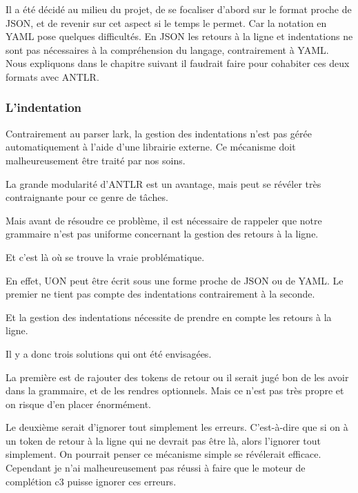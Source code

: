 \documentclass[
    iict, %
    il, %
]{heig-tb}
\begin{document}
Il a été décidé au milieu du projet, de se focaliser d'abord sur le format proche de JSON, et de revenir sur cet aspect si le temps le permet.
Car la notation en YAML pose quelques difficultés. %
En JSON les retours à la ligne et indentations ne sont pas nécessaires à la compréhension du langage, contrairement à YAML.
Nous expliquons dans le chapitre suivant il faudrait faire pour cohabiter ces deux formats avec ANTLR. %

\subsubsection{L'indentation}


Contrairement au parser lark, la gestion des indentations n'est pas gérée automatiquement à l'aide d'une librairie externe.
Ce mécanisme doit malheureusement être traité par nos soins.

La grande modularité d'ANTLR est un avantage, mais peut se révéler très contraignante pour ce genre de tâches.

Mais avant de résoudre ce problème, il est nécessaire de rappeler que notre grammaire n'est pas uniforme concernant la gestion des retours à la ligne. 

Et c'est là où se trouve la vraie problématique.

En effet, UON peut être écrit sous une forme proche de JSON ou de YAML. Le premier ne tient pas compte des indentations contrairement à la seconde.

Et la gestion des indentations nécessite de prendre en compte les retours à la ligne. %

Il y a donc trois solutions qui ont été envisagées.

La première est de rajouter des tokens de retour ou il serait jugé bon de les avoir dans la grammaire, et de les rendres optionnels.
Mais ce n'est pas très propre et on risque d'en placer énormément.

Le deuxième serait d'ignorer tout simplement les erreurs.  C'est-à-dire que si on à un token de retour à la ligne qui ne devrait pas être là, alors l'ignorer tout simplement.
On pourrait penser ce mécanisme simple se révélerait efficace. Cependant je n'ai malheureusement pas réussi à faire que le moteur de complétion c3
puisse ignorer ces erreurs.
\end{document}
